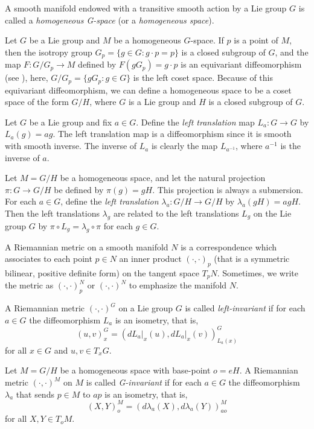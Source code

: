 \documentclass[a4paper,11pt]{article}
\theoremstyle{plain}
\theoremstyle{definition}
\numberwithin{equation}{section}
\begin{document}
A smooth manifold endowed with a transitive smooth action by a Lie group $G$ is called a \textit{homogeneous G-space} (or a \textit{homogeneous space}).


Let $G$ be a Lie group and $M$ be a homogeneous $G$-space. If $p$ is a point of $M$, then the isotropy group $G_p=\{g\in G \colon g\cdot p=p\}$ is a closed subgroup of $G$, and the map $F \colon G/G_p \to M$ defined by $F(gG_p)=g\cdot p$ is an equivariant diffeomorphism (see \cite[Theorem 21.18]{LeeGTM218}), here, $G/G_p=\{gG_p \colon g\in G\}$ is the left coset space. Because of this equivariant diffeomorphism, we can define a homogeneous space to be a coset space of the form $G/H$, where $G$ is a Lie group and $H$ is a closed subgroup of $G$.

Let $G$ be a Lie group and fix $a\in G$. Define the \textit{left translation} map $L_a \colon G \to G$ by $L_a(g)=ag$. The left translation map is a diffeomorphism since it is smooth with smooth inverse. The inverse of $L_a$ is clearly the map $L_{a^{-1}}$, where $a^{-1}$ is the inverse of $a$. 


Let $M=G/H$ be a homogeneous space, and let the natural projection $\pi \colon G\to G/H$ be defined by $\pi(g)=gH$. This projection is always a submersion. For each $a\in G$, define the \textit{left translation} $\lambda_a \colon G/H \to G/H$ by $\lambda_a(gH)=agH$. Then the left translations $\lambda_g$ are related to the left translations $L_g$ on the Lie group $G$ by $\pi \circ L_g = \lambda_g \circ \pi$ for each $g\in G$. 


\vskip 4mm


A Riemannian metric on a smooth manifold $N$ is a correspondence which associates to each point $p\in N$ an inner product $(\cdot,\cdot)_p$ (that is a symmetric bilinear, positive definite form) on the tangent space $T_{p}N$. Sometimes, we write the metric as $(\cdot,\cdot)^{N}_p$ or $(\cdot,\cdot)^{N}$ to emphasize the manifold $N$.


A Riemannian metric $(\cdot,\cdot)^{G}$ on a Lie group $G$ is called \textit {left-invariant} if for each $a\in G$ the diffeomorphism $L_a$ is an isometry, that is,
$$(u,v)^{G}_x=(dL_a\vert_x(u),dL_a\vert_x(v))^{G}_{L_a(x)}$$ for all $x\in G$ and $u,v\in T_{x}G$.

Let $M=G/H$ be a homogeneous space with base-point $o=eH$. A Riemannian metric $(\cdot,\cdot)^{M}$ on $M$ is called \textit{G-invariant} if for each $a\in G$ the diffeomorphism $\lambda_a$ that sends $p\in M$ to $ap$ is an isometry, that is, $$(X,Y)^{M}_{o}=(d\lambda_a(X),d\lambda_a(Y))^{M}_{ao}$$ for all $X,Y\in T_oM$.
\end{document}
